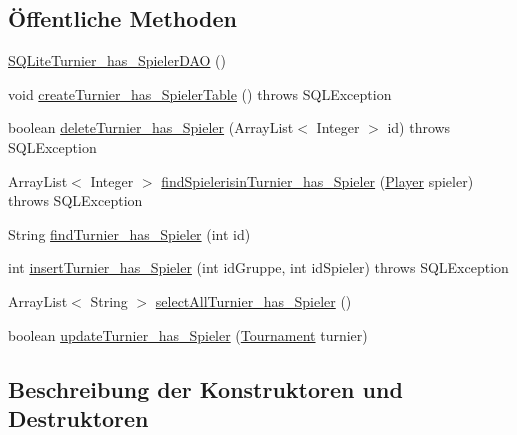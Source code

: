 \subsection*{Öffentliche Methoden}
\begin{DoxyCompactItemize}
\item 
\hyperlink{classde_1_1turnierverwaltung_1_1mysql_1_1_s_q_lite_turnier__has___spieler_d_a_o_a38bf57d1c6057eaec4fe12fcc073abef}{S\+Q\+Lite\+Turnier\+\_\+has\+\_\+\+Spieler\+D\+AO} ()
\item 
void \hyperlink{classde_1_1turnierverwaltung_1_1mysql_1_1_s_q_lite_turnier__has___spieler_d_a_o_ac7a93f91bafdd2faae3cfcc2d5a4db15}{create\+Turnier\+\_\+has\+\_\+\+Spieler\+Table} ()  throws S\+Q\+L\+Exception 
\item 
boolean \hyperlink{classde_1_1turnierverwaltung_1_1mysql_1_1_s_q_lite_turnier__has___spieler_d_a_o_ab185410903d0a5a91e31781b917b00d1}{delete\+Turnier\+\_\+has\+\_\+\+Spieler} (Array\+List$<$ Integer $>$ id)  throws S\+Q\+L\+Exception 
\item 
Array\+List$<$ Integer $>$ \hyperlink{classde_1_1turnierverwaltung_1_1mysql_1_1_s_q_lite_turnier__has___spieler_d_a_o_a62ade1e053752954f6f08a04b716a77b}{find\+Spielerisin\+Turnier\+\_\+has\+\_\+\+Spieler} (\hyperlink{classde_1_1turnierverwaltung_1_1model_1_1_player}{Player} spieler)  throws S\+Q\+L\+Exception 
\item 
String \hyperlink{classde_1_1turnierverwaltung_1_1mysql_1_1_s_q_lite_turnier__has___spieler_d_a_o_aeb7157f81280fb7ee0bb725c40728093}{find\+Turnier\+\_\+has\+\_\+\+Spieler} (int id)
\item 
int \hyperlink{classde_1_1turnierverwaltung_1_1mysql_1_1_s_q_lite_turnier__has___spieler_d_a_o_aeaf759d61ed1c9b4970db6db7aa5dcc1}{insert\+Turnier\+\_\+has\+\_\+\+Spieler} (int id\+Gruppe, int id\+Spieler)  throws S\+Q\+L\+Exception 
\item 
Array\+List$<$ String $>$ \hyperlink{classde_1_1turnierverwaltung_1_1mysql_1_1_s_q_lite_turnier__has___spieler_d_a_o_a27f1ff6cf6dd0bf2b3cf38bd2431b94b}{select\+All\+Turnier\+\_\+has\+\_\+\+Spieler} ()
\item 
boolean \hyperlink{classde_1_1turnierverwaltung_1_1mysql_1_1_s_q_lite_turnier__has___spieler_d_a_o_a1f37d7cf45b63d403c8254492029ebd7}{update\+Turnier\+\_\+has\+\_\+\+Spieler} (\hyperlink{classde_1_1turnierverwaltung_1_1model_1_1_tournament}{Tournament} turnier)
\end{DoxyCompactItemize}


\subsection{Beschreibung der Konstruktoren und Destruktoren}
